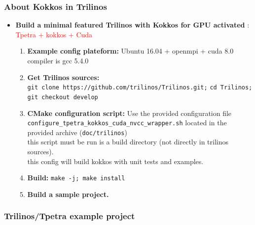 \begin{frame}
  \frametitle{About Kokkos in Trilinos}

  \begin{itemize}
  \item \textbf{Build a minimal featured Trilinos with Kokkos for GPU activated} : \textcolor{red}{Tpetra + kokkos + Cuda}
    \begin{enumerate}
    \item \textbf{Example config plateform:} Ubuntu 16.04 + openmpi + cuda 8.0\\
      compiler is gcc 5.4.0
    \item \textbf{Get Trilinos sources:}\\
      \texttt{git clone https://github.com/trilinos/Trilinos.git;} \texttt{cd Trilinos; git checkout develop}
    \item \textbf{CMake configuration script:} Use the provided configuration file \texttt{configure\_tpetra\_kokkos\_cuda\_nvcc\_wrapper.sh} located in the provided archive (\texttt{doc/trilinos})\\
      this script must be run is a build directory (not directly in trilinos sources).\\
      this config will build kokkos with unit tests and examples.
    \item \textbf{Build:} \texttt{make -j; make install}
    \item \textbf{Build a sample project.}
    \end{enumerate}
  \end{itemize}

\end{frame}

\begin{frame}
  \frametitle{Trilinos/Tpetra example project}

\end{frame}
